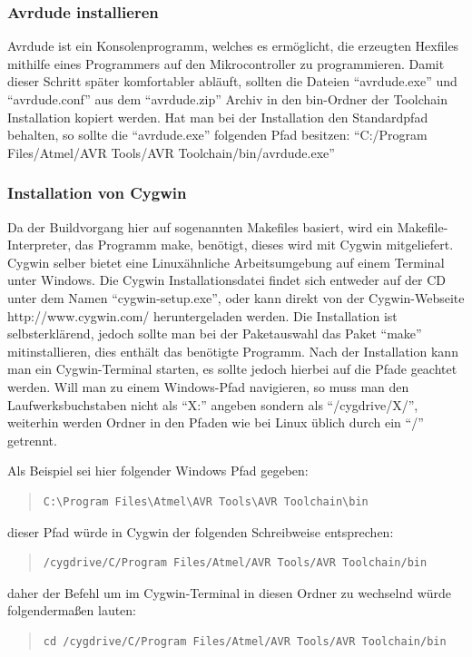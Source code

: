 \documentclass[a4paper,14pt,headsepline]{scrartcl}
\begin{document}
\subsubsection{Avrdude installieren}
Avrdude ist ein Konsolenprogramm, welches es ermöglicht, die erzeugten Hexfiles mithilfe eines Programmers auf den Mikrocontroller zu programmieren. Damit dieser Schritt später komfortabler abläuft, sollten die Dateien "`avrdude.exe"' und "`avrdude.conf"' aus dem "`avrdude.zip"' Archiv in den bin-Ordner der Toolchain Installation kopiert werden. Hat man bei der Installation den Standardpfad behalten, so sollte die "`avrdude.exe"' folgenden Pfad besitzen: "`C:/Program Files/Atmel/AVR Tools/AVR Toolchain/bin/avrdude.exe"'

\subsubsection{Installation von Cygwin}
Da der Buildvorgang hier auf sogenannten Makefiles basiert, wird ein Makefile-Interpreter, das Programm make, benötigt, dieses wird mit Cygwin mitgeliefert. Cygwin selber bietet eine Linuxähnliche Arbeitsumgebung auf einem Terminal unter Windows. Die Cygwin Installationsdatei findet sich entweder auf der CD unter dem Namen "`cygwin-setup.exe"', oder kann direkt von der Cygwin-Webseite http://www.cygwin.com/ heruntergeladen werden. Die Installation ist selbsterklärend, jedoch sollte man bei der Paketauswahl das Paket "`make"' mitinstallieren, dies enthält das benötigte Programm. Nach der Installation kann man ein Cygwin-Terminal starten, es sollte jedoch hierbei auf die Pfade geachtet werden. Will man zu einem Windows-Pfad navigieren, so muss man den Laufwerksbuchstaben nicht als "`X:"' angeben sondern als "`/cygdrive/X/"', weiterhin werden Ordner in den Pfaden wie bei Linux üblich durch ein "`/"' getrennt.

Als Beispiel sei hier folgender Windows Pfad gegeben:
\begin{quote}
\begin{verbatim}
C:\Program Files\Atmel\AVR Tools\AVR Toolchain\bin
\end{verbatim}
\end{quote}
dieser Pfad würde in Cygwin der folgenden Schreibweise entsprechen:
\begin{quote}
\begin{verbatim}
/cygdrive/C/Program Files/Atmel/AVR Tools/AVR Toolchain/bin
\end{verbatim}
\end{quote}
daher der Befehl um im Cygwin-Terminal in diesen Ordner zu wechselnd würde folgendermaßen lauten:
\begin{quote}
\begin{verbatim}
cd /cygdrive/C/Program Files/Atmel/AVR Tools/AVR Toolchain/bin
\end{verbatim}
\end{quote}
\end{document}
